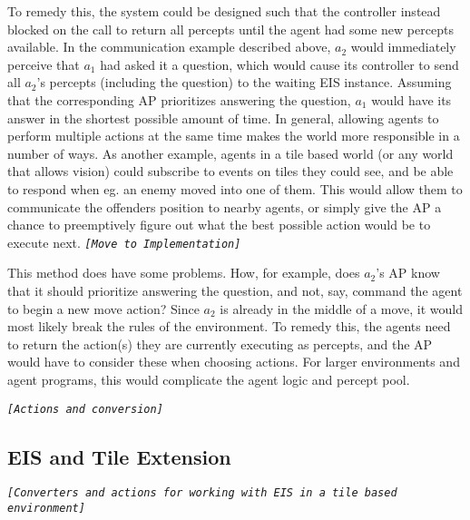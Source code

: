 To remedy this, the system could be designed such that the controller
instead blocked on the call to return all percepts until the agent
had some new percepts available. In the communication example described
above, $a_{2}$ would immediately perceive that $a_{1}$ had asked
it a question, which would cause its controller to send all $a_{2}$'s
percepts (including the question) to the waiting EIS instance. Assuming
that the corresponding AP prioritizes answering the question, $a_{1}$
would have its answer in the shortest possible amount of time. In
general, allowing agents to perform multiple actions at the same time
makes the world more responsible in a number of ways. As another example,
agents in a tile based world (or any world that allows vision) could
subscribe to events on tiles they could see, and be able to respond
when eg. an enemy moved into one of them. This would allow them to
communicate the offenders position to nearby agents, or simply give
the AP a chance to preemptively figure out what the best possible
action would be to execute next. \texttt{\emph{{[}Move to Implementation{]}}}

This method does have some problems. How, for example, does $a_{2}$'s
AP know that it should prioritize answering the question, and not,
say, command the agent to begin a new move action? Since $a_{2}$
is already in the middle of a move, it would most likely break the
rules of the environment. To remedy this, the agents need to return
the action(s) they are currently executing as percepts, and the AP
would have to consider these when choosing actions. For larger environments
and agent programs, this would complicate the agent logic and percept
pool.

\texttt{\emph{{[}Actions and conversion{]}}}


\subsection{EIS and Tile Extension}

\texttt{\emph{{[}Converters and actions for working with EIS in a
tile based environment{]}}}
